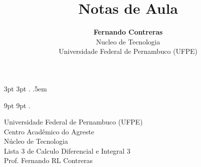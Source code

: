\theoremstyle{note}
\newtheorem{note}{Note}

  {3pt}%
  {3pt}%
  {\itshape}%
  {}%
  {\bfseries}%
  {.}%
  {.5em}%
  {}%

\theoremstyle{citing}
\newtheorem*{varthm}{}%

  {9pt}%
  {9pt}%
  {\itshape}%
  {}%
  {\bfseries}%
  {.}%
  {\newline}%
  {}%

\theoremstyle{break}
\newtheorem{bthm}{B-Theorem}

\theoremstyle{exercise}
\newtheorem{exer}{Exercise}

\swapnumbers
\theoremstyle{plain}
\newtheorem{thmsw}{Theorem}[section]
\newtheorem{propsw}{Proposition}

\let\lvert=|\let\rvert=|
\newcommand{\Ric}{\mathop{\mathrm{Ric}}\nolimits}

\addtolength{\textwidth}{8pt}

\title{ \textbf{Notas de Aula}}

\author{\textbf{Fernando Contreras}\\
	\large Nucleo de Tecnologia\\
	Universidade Federal de Pernambuco (UFPE)}




	\begin{center}
		Universidade Federal de Pernambuco (UFPE)\\
		Centro Acadêmico do Agreste\\
		Núcleo de Tecnologia\\
		
		Lista 3 de Calculo Diferencial e Integral 3\\
		Prof. Fernando RL Contreras
	\end{center}


